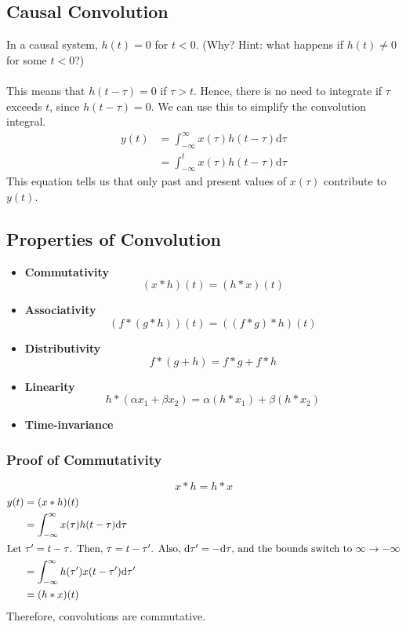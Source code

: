 \documentclass[10pt]{article}
\begin{document}
\subsection*{Causal Convolution}
In a causal system, $h(t) = 0$ for $t < 0$.  (Why?  Hint: what happens if $h(t) \neq 0$ for some $t < 0$?)\\\\
This means that $h(t - \tau) = 0$ if $\tau > t$.  Hence, there is no need to integrate if $\tau$ exceeds $t$, since $h(t - \tau) = 0$.  We can use this to simplify the convolution integral.
\begin{align*}
    y(t) &= \int_{-\infty}^\infty x(\tau) h(t - \tau) \text{d}\tau\\
    &= \int_{-\infty}^t x(\tau) h(t - \tau) \text{d}\tau
\end{align*}
This equation tells us that only past and present values of $x(\tau)$ contribute to $y(t)$.

\subsection*{Properties of Convolution}
\begin{itemize}
    \item \textbf{Commutativity}
    \[(x * h)(t) = (h * x)(t)\]
    \item \textbf{Associativity}
    \[(f * (g * h))(t) = ((f * g) * h)(t)\]
    \item \textbf{Distributivity}
    \[f * (g + h) = f * g + f * h\]
    \item \textbf{Linearity}
    \[h * (\alpha x_1 + \beta x_2) = \alpha(h * x_1) + \beta(h * x_2)\]
    \item \textbf{Time-invariance}
\end{itemize}

\subsubsection*{Proof of Commutativity}
\[x * h = h * x\]
\begin{align*}
    y(t) &= (x * h)(t) \\
    &= \int_{-\infty}^\infty x(\tau) h(t - \tau) \text{d}\tau\\
\intertext{Let $\tau' = t - \tau$.  Then, $\tau = t - \tau'$.  Also, $\text{d}\tau' = -\text{d}\tau$, and the bounds switch to $\infty \rightarrow -\infty$}
    &= \int_{-\infty}^\infty h(\tau')x(t - \tau') \text{d}\tau'\\
    &= (h * x)(t)
\end{align*}
Therefore, convolutions are commutative.
\end{document}
